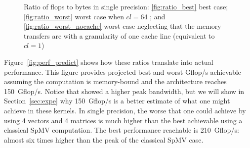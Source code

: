 \documentclass[10pt,conference,compsocconf]{IEEEtran}
\begin{document}
\begin{figure}
  \centering
  
  \caption{Ratio of flops to bytes in single precision:  
    \ref{fig:ratio_best} best case; \ref{fig:ratio_worst} worst case when $cl=64$ 
    ; and \ref{fig:ratio_worst_nocache} worst case neglecting that the
    memory transfers are with a granularity of one cache line (equivalent to $cl = 1$)}
  \label{fig:ratio_bytes_flops}
\end{figure}

Figure~\ref{fig:perf_predict} shows how these ratios translate
into actual performance. This figure provides projected best and worst
Gflop/s achievable assuming the computation is memory-bound and the
architecture reaches 150~Gflop/s. Notice that \cite{Saule13-ARXIV}
showed a higher peak bandwidth, but we will show in
Section~\ref{sec:expe} why 150~Gflop/s is a better estimate of what one
might achieve in these kernels. In single precision, the worse that
one could achieve by using 4 vectors and 4 matrices is much higher
than the best achievable using a classical SpMV computation. The best
performance reachable is 210~Gflop/s: almost six times higher than the
peak of the classical SpMV case. 
\end{document}
